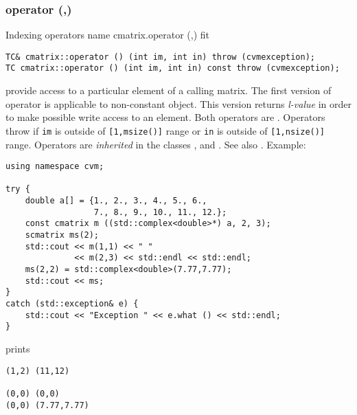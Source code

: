 \subsubsection{operator (,)}
Indexing operators%
\pdfdest name {cmatrix.operator (,)} fit
\begin{verbatim}
TC& cmatrix::operator () (int im, int in) throw (cvmexception);
TC cmatrix::operator () (int im, int in) const throw (cvmexception);
\end{verbatim}
provide access to a particular element of a calling matrix. The first version
of operator is applicable to  non-constant object.
This version returns  \emph{l-value}
in order to make possible write access to an element.
Both operators are \Based.
Operators throw 
if \verb"im" is outside of \verb"[1,msize()]" range or
\verb"in" is outside of \verb"[1,nsize()]" range.
Operators are \emph{inherited}
in the classes
,  
and .
See also .
Example:
\begin{Verbatim}
using namespace cvm;

try {
    double a[] = {1., 2., 3., 4., 5., 6.,
                  7., 8., 9., 10., 11., 12.};
    const cmatrix m ((std::complex<double>*) a, 2, 3);
    scmatrix ms(2);
    std::cout << m(1,1) << " " 
              << m(2,3) << std::endl << std::endl;
    ms(2,2) = std::complex<double>(7.77,7.77);
    std::cout << ms;
}
catch (std::exception& e) {
    std::cout << "Exception " << e.what () << std::endl;
}
\end{Verbatim}
prints
\begin{Verbatim}
(1,2) (11,12)

(0,0) (0,0)
(0,0) (7.77,7.77)
\end{Verbatim}
\newpage




